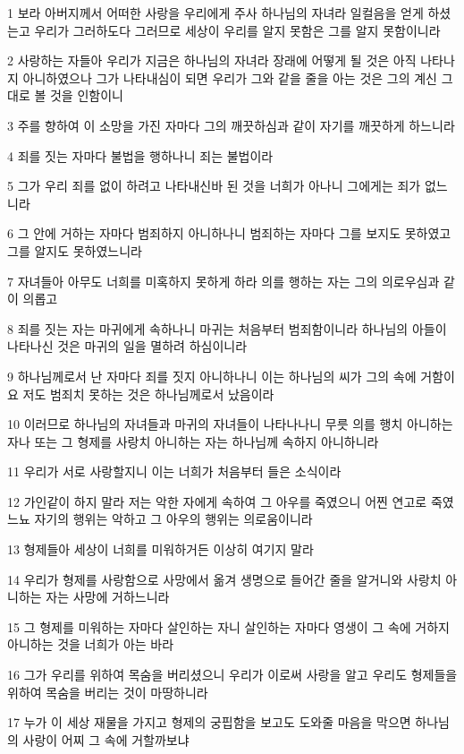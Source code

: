 \par 1 보라 아버지께서 어떠한 사랑을 우리에게 주사 하나님의 자녀라 일컬음을 얻게 하셨는고 우리가 그러하도다 그러므로 세상이 우리를 알지 못함은 그를 알지 못함이니라
\par 2 사랑하는 자들아 우리가 지금은 하나님의 자녀라 장래에 어떻게 될 것은 아직 나타나지 아니하였으나 그가 나타내심이 되면 우리가 그와 같을 줄을 아는 것은 그의 계신 그대로 볼 것을 인함이니
\par 3 주를 향하여 이 소망을 가진 자마다 그의 깨끗하심과 같이 자기를 깨끗하게 하느니라
\par 4 죄를 짓는 자마다 불법을 행하나니 죄는 불법이라
\par 5 그가 우리 죄를 없이 하려고 나타내신바 된 것을 너희가 아나니 그에게는 죄가 없느니라
\par 6 그 안에 거하는 자마다 범죄하지 아니하나니 범죄하는 자마다 그를 보지도 못하였고 그를 알지도 못하였느니라
\par 7 자녀들아 아무도 너희를 미혹하지 못하게 하라 의를 행하는 자는 그의 의로우심과 같이 의롭고
\par 8 죄를 짓는 자는 마귀에게 속하나니 마귀는 처음부터 범죄함이니라 하나님의 아들이 나타나신 것은 마귀의 일을 멸하려 하심이니라
\par 9 하나님께로서 난 자마다 죄를 짓지 아니하나니 이는 하나님의 씨가 그의 속에 거함이요 저도 범죄치 못하는 것은 하나님께로서 났음이라
\par 10 이러므로 하나님의 자녀들과 마귀의 자녀들이 나타나나니 무릇 의를 행치 아니하는 자나 또는 그 형제를 사랑치 아니하는 자는 하나님께 속하지 아니하니라
\par 11 우리가 서로 사랑할지니 이는 너희가 처음부터 들은 소식이라
\par 12 가인같이 하지 말라 저는 악한 자에게 속하여 그 아우를 죽였으니 어찐 연고로 죽였느뇨 자기의 행위는 악하고 그 아우의 행위는 의로움이니라
\par 13 형제들아 세상이 너희를 미워하거든 이상히 여기지 말라
\par 14 우리가 형제를 사랑함으로 사망에서 옮겨 생명으로 들어간 줄을 알거니와 사랑치 아니하는 자는 사망에 거하느니라
\par 15 그 형제를 미워하는 자마다 살인하는 자니 살인하는 자마다 영생이 그 속에 거하지 아니하는 것을 너희가 아는 바라
\par 16 그가 우리를 위하여 목숨을 버리셨으니 우리가 이로써 사랑을 알고 우리도 형제들을 위하여 목숨을 버리는 것이 마땅하니라
\par 17 누가 이 세상 재물을 가지고 형제의 궁핍함을 보고도 도와줄 마음을 막으면 하나님의 사랑이 어찌 그 속에 거할까보냐
